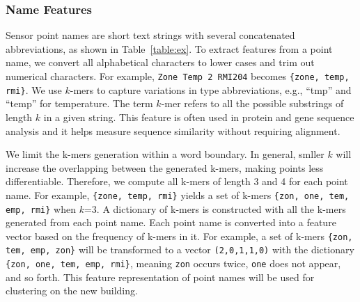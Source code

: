 \subsubsection{Name Features}
Sensor point names are short text strings with several concatenated abbreviations, as shown in Table~\ref{table:ex}.
To extract features from a point name, we convert all alphabetical characters to lower cases and trim out numerical characters.
For example, \texttt{Zone Temp 2 RMI204} becomes \texttt{\{zone, temp, rmi\}}.
We use $k$-mers \cite{leslie2004mismatch} to capture variations in type abbreviations, e.g., ``tmp'' and ``temp'' for temperature.
The term $k$-mer refers to all the possible substrings of length $k$ in a given string. This feature is often used in protein and gene sequence analysis and
it helps measure sequence similarity without requiring alignment.

We limit the k-mers generation within a word boundary.
In general, smller $k$ will increase the overlapping between the generated k-mers, making points less differentiable.
Therefore, we compute all k-mers of length 3 and 4 for each point name.
For example, \texttt{\{zone, temp, rmi\}} yields a set of k-mers \texttt{\{zon, one, tem, emp, rmi\}} when $k$=3.
A dictionary of k-mers is constructed with all the k-mers generated from each point name.
Each point name is converted into a feature vector based on the frequency of k-mers in it.
For example, a set of k-mers \texttt{\{zon, tem, emp, zon\}} will be transformed to a vector
\texttt{(2,0,1,1,0)} with the dictionary \texttt{\{zon, one, tem, emp, rmi\}}, meaning \texttt{zon} occurs twice, \texttt{one} does
not appear, and so forth.
This feature representation of point names will be used for clustering on the new building.



